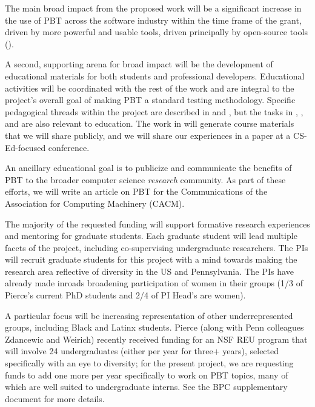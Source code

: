 {\smallskip
{} The main broad impact from the
proposed work will be a significant increase in the use of PBT across
the software industry within the time frame of the grant, driven
by more powerful and usable tools, driven principally by open-source
tools ().

\smallskip
{}
%
A second, supporting arena for broad impact will be the
development of educational materials for both students and
professional developers. Educational activities will be
coordinated with the rest of the work and are integral to the
project's overall goal of making PBT a standard testing methodology.
Specific pedagogical
threads within the project are described in  and , but the
tasks in
,
, and
 are also relevant to education. The
work in  will generate course materials that we will
share publicly, and we will share our experiences in a paper at a
CS-Ed-focused conference.

An ancillary educational goal is to
publicize and communicate the benefits of PBT to the broader computer science
{\em research} community. As part of these efforts, we will write an article on PBT
for the Communications of the Association for Computing Machinery
(CACM).

\smallskip
{}
%
The majority of the requested funding will support formative research
experiences and mentoring for graduate students. Each graduate
student will lead multiple facets of the
project, including co-supervising undergraduate
researchers.
%
The PIs will recruit graduate students for this project with a mind towards making
the research area reflective of diversity in the US and Pennsylvania.
The PIs have already made inroads broadening participation of women in their
groups (1/3 of Pierce's current PhD students and 2/4 of PI
Head's are women).

A particular focus
will be increasing representation of
other underrepresented groups, including Black and Latinx
students. Pierce (along with Penn colleagues Zdancewic and Weirich)
recently received funding for an
NSF REU program that will involve 24 undergraduates (either per
year for three+ years), selected specifically with an eye to diversity;
for the present project, we are requesting funds to add one more per
year specifically to work on PBT topics, many of which are well suited
to undergraduate interns. See the BPC
supplementary
document for more details.

}
